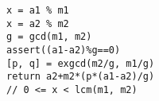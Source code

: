 \begin{lstlisting}
x = a1 % m1
x = a2 % m2
g = gcd(m1, m2)
assert((a1-a2)%g==0)
[p, q] = exgcd(m2/g, m1/g)
return a2+m2*(p*(a1-a2)/g)
// 0 <= x < lcm(m1, m2)
\end{lstlisting}
